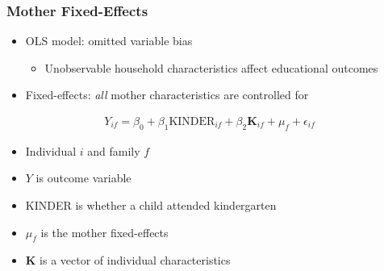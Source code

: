 \documentclass{beamer}
\begin{document}
\begin{frame}
\frametitle{Mother Fixed-Effects}
\begin{itemize}
	\item OLS model: omitted variable bias
	\begin{itemize}
		\item Unobservable household characteristics affect educational outcomes
	\end{itemize}
	\vspace{0.1in}
	\item Fixed-effects: \textit{all} mother characteristics are controlled for
\end{itemize}
\begin{gather}
Y_{if} = \beta_0 + \beta_1\text{KINDER}_{if} + \beta_2 \mathbf{K}_{if} + \mu_f + \epsilon_{if}
\end{gather}
\vspace{-0.2in}
{\footnotesize \begin{itemize}
	\item Individual $i$ and family $f$
	\item $Y$ is outcome variable
	\item KINDER is whether a child attended kindergarten
	\item $\mu_f$ is the mother fixed-effects 
	\item $\mathbf{K}$ is a vector of individual characteristics
\end{itemize} }
\end{frame}
\end{document}
